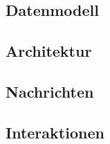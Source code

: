 

\subsection{Datenmodell}\label{sec:dat_model}


\subsection{Architektur}\label{sec:architecture}


\subsection{Nachrichten}\label{sec:messages}


\subsection{Interaktionen}\label{sec:interactions}

